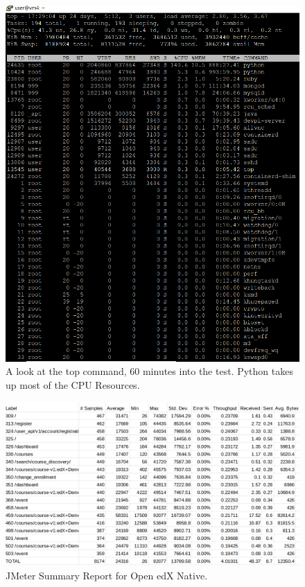 \documentclass[12pt]{report}
\begin{document}
\begin{figure}[h!]
	\centering
	\includegraphics[width=\textwidth,height=\textheight,keepaspectratio]{intro/S4_harshit.png}
	\caption{A look at the top command, 60 minutes into the test. Python takes up most of the CPU Resources.}
\end{figure}

\begin{figure}[h!]
	\centering
	\includegraphics[width=\textwidth,height=\textheight,keepaspectratio]{intro/3.png}
	\caption{JMeter Summary Report for Open edX Native.}
\end{figure}
\end{document}
